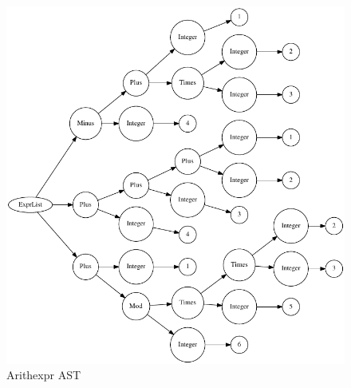 \begin{figure}[!ht]
	\centering
		\includegraphics{arith_expr_tree.pdf}
	\caption{Arithexpr AST}
	\label{fig:arith_expr_tree}
\end{figure}

